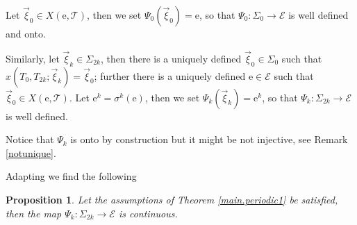 \documentclass[10pt]{article}
\numberwithin{equation}{section}
\def\ee{{\mathrm e}}
\def\EE{{\mathcal E}}
\def\TT{{\mathcal T}}
\def\xxi{\vec{\xi}}
\newtheorem{proposition}[theorem]{Proposition}
\theoremstyle{definition}
\theoremstyle{remark}
\begin{document}
 Let $\xxi_0 \in X(\ee, \TT)$, then we set
  $\Psi_0(\xxi_0)=\ee$, so that
    $\Psi_0: \Sigma_0 \to \EE$ is well defined and onto.


  Similarly, let $\xxi_k \in \Sigma_{2k}$, then there is a  uniquely defined
  $\xxi_0\in \Sigma_0$  such that $x(T_0, T_{2k}; \xxi_k)=\xxi_0$; further there is a uniquely defined
  $\ee \in \EE$ such that $\xxi_0 \in X(\ee, \TT)$. Let $\ee^k= \sigma^k(\ee)$, then we
  set $\Psi_k(\xxi_k)=\ee^k$, so that $\Psi_k: \Sigma_{2k} \to \EE$ is well defined.

 Notice that   $\Psi_k$ is onto by construction  but it might  be not injective, see Remark \ref{notunique}.

Adapting \cite[Proposition 6.4]{CFPrestate} we find the following
\begin{proposition}\label{continuityine}
Let the assumptions of   Theorem \ref{main.periodic1}  be satisfied,
then the map $\Psi_k: \Sigma_{2k} \to \EE$ is continuous.
\end{proposition}
\end{document}
